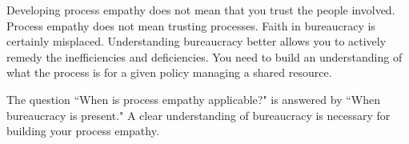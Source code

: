 Developing process empathy does not mean that you trust the people involved. Process empathy does not mean trusting processes. Faith in bureaucracy is certainly misplaced. Understanding bureaucracy better allows you to actively remedy the inefficiencies and deficiencies. 
You need to build an understanding of what the process is for a given policy managing a \gls{shared resource}. 

The question ``When is process empathy applicable?" is answered by ``When bureaucracy is present." A clear understanding of bureaucracy is necessary for building your process empathy.
